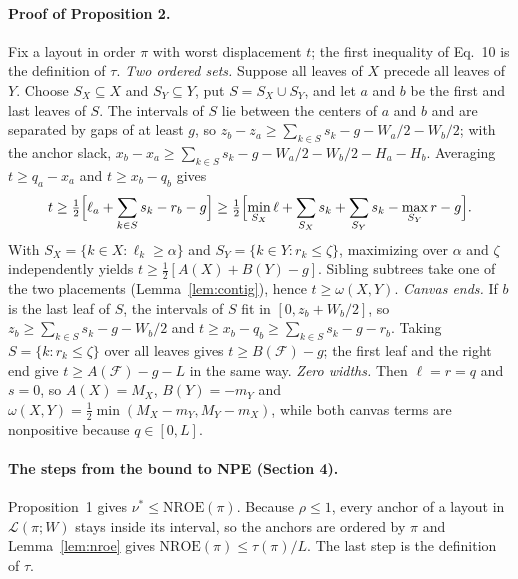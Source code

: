\documentclass[preprint]{vgtc}
\newcommand{\nroe}{\mathrm{NROE}}
\begin{document}
\paragraph{Proof of Proposition 2.} Fix a layout in order $\pi$ with worst displacement $t$; the first inequality of Eq.~10 is the definition of $\tau$.
\emph{Two ordered sets.} Suppose all leaves of $X$ precede all leaves of $Y$. Choose $S_X\subseteq X$ and $S_Y\subseteq Y$, put $S=S_X\cup S_Y$, and let $a$ and $b$ be the first and last leaves of $S$. The intervals of $S$ lie between the centers of $a$ and $b$ and are separated by gaps of at least $g$, so $z_b-z_a\ge\sum_{k\in S}s_k-g-W_a/2-W_b/2$; with the anchor slack, $x_b-x_a\ge\sum_{k\in S}s_k-g-W_a/2-W_b/2-H_a-H_b$. Averaging $t\ge q_a-x_a$ and $t\ge x_b-q_b$ gives
\begin{equation*}
t\ge\tfrac12\Bigl[\ell_a+\sum_{k\in S}s_k-r_b-g\Bigr]\ge\tfrac12\Bigl[\min_{S_X}\ell+\sum_{S_X}s_k+\sum_{S_Y}s_k-\max_{S_Y}r-g\Bigr].
\end{equation*}
With $S_X=\{k\in X:\ell_k\ge\alpha\}$ and $S_Y=\{k\in Y:r_k\le\zeta\}$, maximizing over $\alpha$ and $\zeta$ independently yields $t\ge\tfrac12[A(X)+B(Y)-g]$. Sibling subtrees take one of the two placements (Lemma~\ref{lem:contig}), hence $t\ge\omega(X,Y)$.
\emph{Canvas ends.} If $b$ is the last leaf of $S$, the intervals of $S$ fit in $[0,z_b+W_b/2]$, so $z_b\ge\sum_{k\in S}s_k-g-W_b/2$ and $t\ge x_b-q_b\ge\sum_{k\in S}s_k-g-r_b$. Taking $S=\{k:r_k\le\zeta\}$ over all leaves gives $t\ge B(\mathcal F)-g$; the first leaf and the right end give $t\ge A(\mathcal F)-g-L$ in the same way.
\emph{Zero widths.} Then $\ell=r=q$ and $s=0$, so $A(X)=M_X$, $B(Y)=-m_Y$ and $\omega(X,Y)=\tfrac12\min(M_X-m_Y,M_Y-m_X)$, while both canvas terms are nonpositive because $q\in[0,L]$.

\paragraph{The steps from the bound to NPE (Section 4).} Proposition~1 gives $\nu^*\le\nroe(\pi)$. Because $\rho\le1$, every anchor of a layout in $\mathcal L(\pi;W)$ stays inside its interval, so the anchors are ordered by $\pi$ and Lemma~\ref{lem:nroe} gives $\nroe(\pi)\le\tau(\pi)/L$. The last step is the definition of $\tau$.
\end{document}
